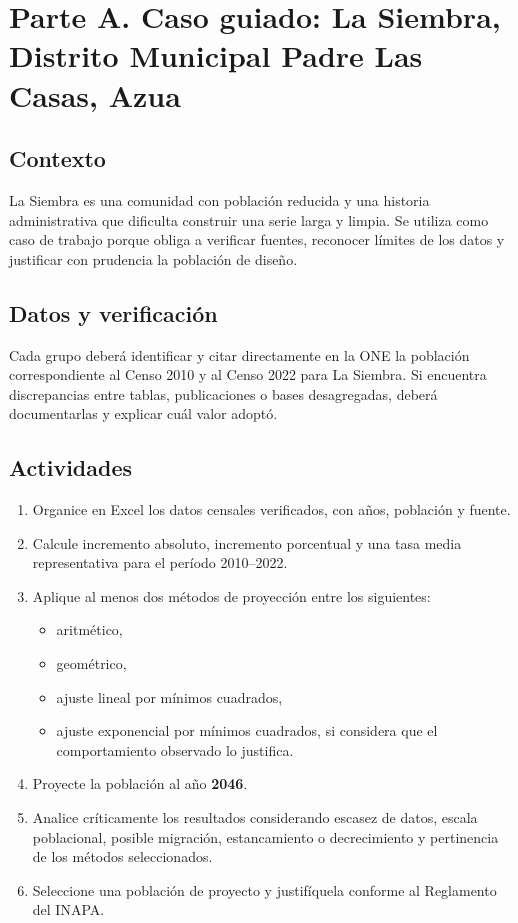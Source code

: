 \documentclass[12pt]{article}
\begin{document}
\section{Parte A. Caso guiado: La Siembra, Distrito Municipal Padre Las Casas, Azua}
\subsection{Contexto}
La Siembra es una comunidad con población reducida y una historia administrativa que dificulta construir una serie larga y limpia. Se utiliza como caso de trabajo porque obliga a verificar fuentes, reconocer límites de los datos y justificar con prudencia la población de diseño.

\subsection{Datos y verificación}
Cada grupo deberá identificar y citar directamente en la ONE la población correspondiente al Censo 2010 y al Censo 2022 para La Siembra. Si encuentra discrepancias entre tablas, publicaciones o bases desagregadas, deberá documentarlas y explicar cuál valor adoptó.

\subsection{Actividades}
\begin{enumerate}
\item Organice en Excel los datos censales verificados, con años, población y fuente.
\item Calcule incremento absoluto, incremento porcentual y una tasa media representativa para el período 2010--2022.
\item Aplique al menos dos métodos de proyección entre los siguientes:
\begin{itemize}
\item aritmético,
\item geométrico,
\item ajuste lineal por mínimos cuadrados,
\item ajuste exponencial por mínimos cuadrados, si considera que el comportamiento observado lo justifica.
\end{itemize}
\item Proyecte la población al año \textbf{2046}.
\item Analice críticamente los resultados considerando escasez de datos, escala poblacional, posible migración, estancamiento o decrecimiento y pertinencia de los métodos seleccionados.
\item Seleccione una población de proyecto y justifíquela conforme al Reglamento del INAPA.
\end{enumerate}
\end{document}
